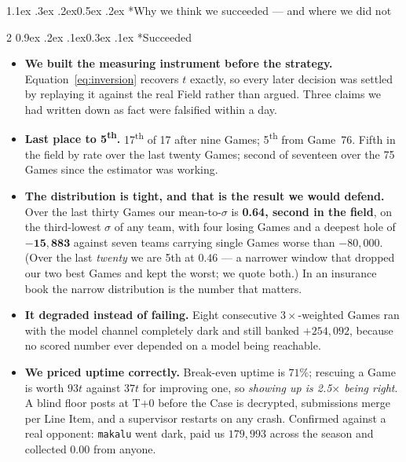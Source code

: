 \documentclass[9pt,a4paper,twocolumn]{article}
\makeatletter
\renewcommand\section{\@startsection{section}{1}{\z@}%
  {1.1ex \@plus .3ex \@minus .2ex}{0.5ex \@plus .2ex}%
  {\normalfont\normalsize\bfseries}}
\renewcommand\subsection{\@startsection{subsection}{2}{\z@}%
  {0.9ex \@plus .2ex \@minus .1ex}{0.3ex \@plus .1ex}%
  {\normalfont\small\bfseries}}
\newcommand{\fair}{t}
\makeatother
\begin{document}
\section*{\textcolor{accent}{Why we think we succeeded --- and where we did not}}
\vspace{-0.4em}
\begin{multicols}{2}
\subsection*{Succeeded}
\begin{itemize}
\item \textbf{We built the measuring instrument before the strategy.} Equation~\eqref{eq:inversion}
recovers $\fair$ exactly, so every later decision was settled by replaying it against the real
Field rather than argued. Three claims we had written down as fact were falsified within a day.
\item \textbf{Last place to 5\textsuperscript{th}.} 17\textsuperscript{th} of 17 after nine Games;
5\textsuperscript{th} from Game~76. Fifth in the field by rate over the last twenty Games; second
of seventeen over the 75 Games since the estimator was working.
\item \textbf{The distribution is tight, and that is the result we would defend.} Over the last
thirty Games our mean-to-$\sigma$ is \textbf{0.64, second in the field}, on the third-lowest
$\sigma$ of any team, with four losing Games and a deepest hole of $\mathbf{-15{,}883}$ against
seven teams carrying single Games worse than $-80{,}000$. (Over the last \emph{twenty} we are 5th
at $0.46$ --- a narrower window that dropped our two best Games and kept the worst; we quote both.) In an insurance
book the narrow distribution is the number that matters.
\item \textbf{It degraded instead of failing.} Eight consecutive $3\times$-weighted Games ran with
the model channel completely dark and still banked $+254{,}092$, because no scored number ever
depended on a model being reachable.
\item \textbf{We priced uptime correctly.} Break-even uptime is $71\%$; rescuing a Game is worth
$93\fair$ against $37\fair$ for improving one, so \emph{showing up is 2.5$\times$ being right}. A
blind floor posts at T$+$0 before the Case is decrypted, submissions merge per Line Item, and a
supervisor restarts on any crash. Confirmed against a real opponent: \texttt{makalu} went dark,
paid us $179{,}993$ across the season and collected $0.00$ from anyone.
\end{itemize}


\end{multicols}
\end{document}
